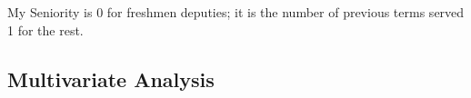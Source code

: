 \documentclass[letter,12pt]{article}
\begin{document}
My Seniority is 0 for freshmen deputies; it is the number of previous terms served 1 for the rest. 

  
  \subsection{Multivariate Analysis}





\end{document}
